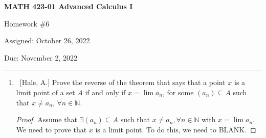 \documentclass[10pt]{article}
\theoremstyle{definition}
\begin{document}
\pagestyle{empty}  %

\begin{center}  %

{\bf MATH 423-01  Advanced Calculus I

Homework \#6

Assigned: October 26, 2022

Due: November 2, 2022}

\end{center}

\medskip

\hrule   %

\bigskip


\begin{enumerate}


\item  ~[Hale, A.] Prove the reverse of the theorem that says that a point $x$ is a limit point of a set $A$ if and only if $x = \lim{a_n}$, for some $(a_n) \subseteq A$ such that $x \neq a_n$, $\forall n \in \mathbb{N}$.
\begin{proof}
Assume that $\exists (a_n) \subseteq A$ such that $x \neq a_n, \forall n \in \mathbb{N}$ with $x=\lim{a_n}$.  We need to prove that $x$ is a limit point.  To do this, we need to BLANK.
\end{proof}
	

%
%	
%	
%	
%	
	

%	
%	
%	
	

\end{enumerate}
\end{document}

